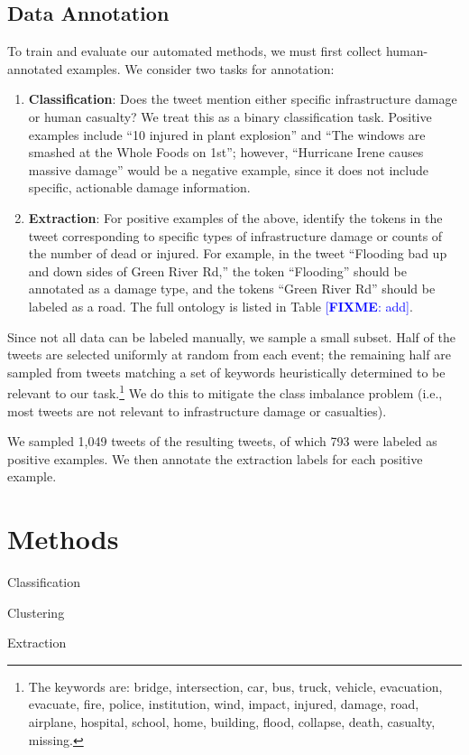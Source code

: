 \documentclass{article}
\newcommand{\FIXME}[1]{\textcolor{blue}{[\textbf{FIXME}: {#1}]}}
\begin{document}
\subsection{Data Annotation}
To train and evaluate our automated methods, we must first collect
human-annotated examples. We consider two tasks for annotation:
\begin{enumerate}
  \item {\bf Classification}: Does the tweet mention either specific
    infrastructure damage or human casualty? We treat this as a binary
    classification task. Positive examples include ``10 injured in plant
    explosion'' and ``The windows are smashed at the Whole Foods on 1st'';
    however, ``Hurricane Irene causes massive damage'' would be a negative
    example, since it does not include specific, actionable damage
    information.
  \item {\bf Extraction}: For positive examples of the above, identify the
    tokens in the tweet corresponding to specific types of infrastructure
    damage or counts of the number of dead or injured. For example, in the
    tweet ``Flooding bad up and down sides of Green River Rd,'' the token
    ``Flooding'' should be annotated as a damage type, and the tokens ``Green
    River Rd'' should be labeled as a road. The full ontology is listed in
    Table \FIXME{add}.
\end{enumerate}

Since not all data can be labeled manually, we sample a small subset. Half of
the tweets are selected uniformly at random from each event; the remaining
half are sampled from tweets matching a set of keywords heuristically
determined to be relevant to our task.\footnote{The keywords are: bridge,
  intersection, car, bus, truck, vehicle, evacuation, evacuate, fire, police,
  institution, wind, impact, injured, damage, road, airplane, hospital,
  school, home, building, flood, collapse, death, casualty, missing.} We do
this to mitigate the class imbalance problem (i.e., most tweets are not
relevant to infrastructure damage or casualties).

We sampled 1,049 tweets of the resulting tweets, of which 793 were labeled as
positive examples. We then annotate the extraction labels for each positive
example.


\section{Methods}
\begin{outline}
  \item Classification
  \item Clustering
  \item Extraction
\end{outline}
\end{document}

